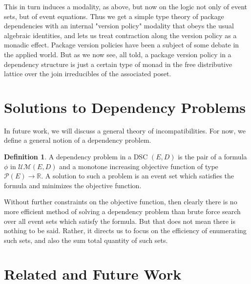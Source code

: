 \documentclass[hoptionsi,review,format=acmsmall]{acmart}
\theoremstyle{definition}
\newtheorem{definition}{Definition}[section]
\newcommand{\UMc}{\mathcal{UM}}
\newcommand{\Pc}{\mathcal{P}}
\newcommand{\band}{\mathbin{\&}}
\newcommand{\bor}{\mathbin{|}}
\newcommand{\Dia}{\diamondsuit}
\begin{document}
This in turn induces a modality, as above, but now on the logic not only of event sets, but of event equations. Thus we get a simple type theory of package dependencies with an internal "version policy" modality that obeys the usual algebraic identities, and lets us treat contraction along the version policy as a monadic effect. Package version policies have been a subject of some debate in the applied world. But as we now see, all told, a package version policy in a dependency structure is just a certain type of monad in the free distributive lattice over the join irreducibles of the associated poset.


\section{Solutions to Dependency Problems}
In future work, we will discuss a general theory of incompatibilities. For now, we define a general notion of a dependency problem.

\begin{definition}
A dependency problem in a DSC \((E,D)\) is the pair of a formula \(\phi\) in \(\UMc(E,D)\) and a monotone increasing objective function of type \(\Pc(E) \rightarrow \mathbb{R}\). A solution to such a problem is an event set which satisfies the formula and minimizes the objective function.
\end{definition}

Without further constraints on the objective function, then clearly there is no more efficient method of solving a dependency problem than brute force search over all event sets which satisfy the formula. But that does not mean there is nothing to be said. Rather, it directs us to focus on the efficiency of enumerating such sets, and also the sum total quantity of such sets.

\section{Related and Future Work}
\end{document}
